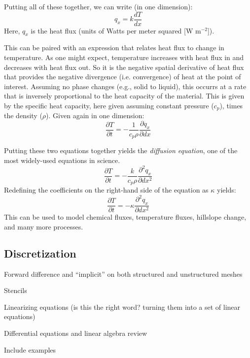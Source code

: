 \documentclass[a4paper,10pt]{scrartcl}
\begin{document}
Putting all of these together, we can write (in one dimension):
\begin{equation}
 q_x = k \frac{d T}{d x}
\end{equation}
Here, $q_x$ is the heat flux (units of Watts per meter squared [W m$^{-2}$]).

This can be paired with an expression that relates heat flux to change in temperature. As one might expect, temperature increases with heat flux in and decreases with heat flux out. So it is the negative spatial derivative of heat flux that provides the negative divergence (i.e. convergence) of heat at the point of interest. Assuming no phase changes (e.g., solid to liquid), this occurrs at a rate that is inversely proportional to the heat capacity of the material. This is given by the specific heat capacity, here given assuming constant pressure ($c_p$), times the density ($\rho$). Given again in one dimension:
\begin{equation}
 \frac{\partial T}{\partial t} = -\frac{1}{c_p \rho} \frac{\partial q_x}{\partial dx}
\end{equation}

Putting these two equations together yields the \emph{diffusion equation}, one of the most widely-used equations in science.
\begin{equation}
 \frac{\partial T}{\partial t} = -\frac{k}{c_p \rho} \frac{\partial^2 q_x}{\partial dx^2}
\end{equation}
Redefining the coefficients on the right-hand side of the equation as $\kappa$ yields:
\begin{equation}
 \frac{\partial T}{\partial t} = -\kappa \frac{\partial^2 q_x}{\partial dx^2}
\end{equation}
This can be used to model chemical fluxes, temperature fluxes, hillslope change, and many more processes.

\subsection{Discretization}





Forward difference and ``implicit''
on both structured and unstructured meshes

Stencils

Linearizing equations (is this the right word? turning them into a set of linear equations)

Differential equations and linear algebra review

Include examples
\end{document}
